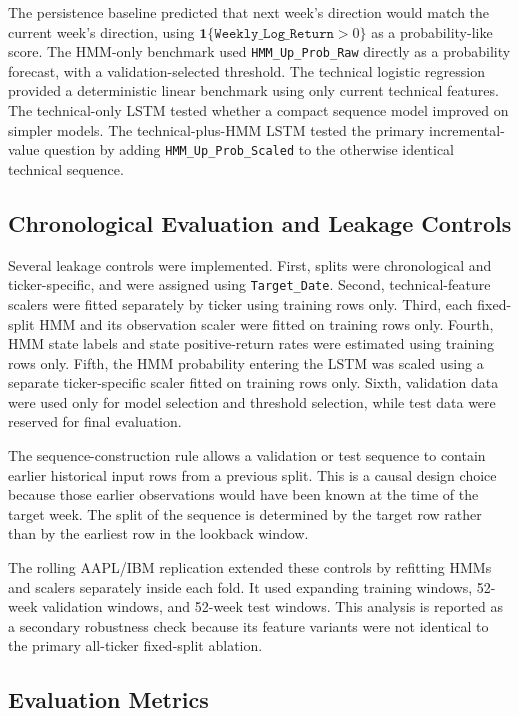 The persistence baseline predicted that next week's direction would match the current week's direction, using \(\mathbf{1}\{\texttt{Weekly\_Log\_Return}>0\}\) as a probability-like score. The HMM-only benchmark used \texttt{HMM\_Up\_Prob\_Raw} directly as a probability forecast, with a validation-selected threshold. The technical logistic regression provided a deterministic linear benchmark using only current technical features. The technical-only LSTM tested whether a compact sequence model improved on simpler models. The technical-plus-HMM LSTM tested the primary incremental-value question by adding \texttt{HMM\_Up\_Prob\_Scaled} to the otherwise identical technical sequence.

\subsection{Chronological Evaluation and Leakage Controls}

Several leakage controls were implemented. First, splits were chronological and ticker-specific, and were assigned using \texttt{Target\_Date}. Second, technical-feature scalers were fitted separately by ticker using training rows only. Third, each fixed-split HMM and its observation scaler were fitted on training rows only. Fourth, HMM state labels and state positive-return rates were estimated using training rows only. Fifth, the HMM probability entering the LSTM was scaled using a separate ticker-specific scaler fitted on training rows only. Sixth, validation data were used only for model selection and threshold selection, while test data were reserved for final evaluation.

The sequence-construction rule allows a validation or test sequence to contain earlier historical input rows from a previous split. This is a causal design choice because those earlier observations would have been known at the time of the target week. The split of the sequence is determined by the target row rather than by the earliest row in the lookback window.

The rolling AAPL/IBM replication extended these controls by refitting HMMs and scalers separately inside each fold. It used expanding training windows, 52-week validation windows, and 52-week test windows. This analysis is reported as a secondary robustness check because its feature variants were not identical to the primary all-ticker fixed-split ablation.

\subsection{Evaluation Metrics}

